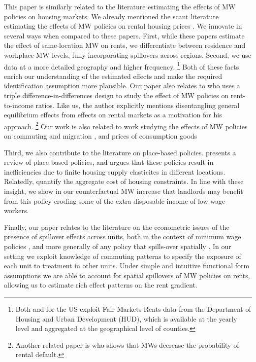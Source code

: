 This paper is similarly related to the literature estimating the effects of MW 
policies on housing markets.
We already mentioned the scant literature estimating the effects of MW policies
on rental housing prices \parencite{Tidemann2018, Yamagishi2021}.
We innovate in several ways when compared to these papers.
First, while these papers estimate the effect of same-location MW on rents, we 
differentiate between residence and workplace MW levels, fully incorporating
spillovers across regions.
Second, we use data at a more detailed geography and higher frequency.%
\footnote{Both \textcite{Tidemann2018} and \textcite{Yamagishi2019} for the US 
exploit Fair Markets Rents data from the Department of Housing and Urban 
Development (HUD), which is available at the yearly level and aggregated at the
geographical level of counties.}
Both of these facts enrich our understanding of the estimated effects and make 
the required identification assumption more plausible.
Our paper also relates to \textcite{Hughes2020} who uses a triple 
difference-in-differences design to study the effect of MW policies 
on rent-to-income ratios. Like us, the author explicitly mentions 
disentangling general equilibrium effects from effects on rental markets as 
a motivation for his approach. 
\footnote{Another related paper is \textcite{AgarwalEtAl2019} who shows that MWs
decrease the probability of rental default.}
Our work is also related to work studying the effects of MW policies on commuting
and migration \parencite{Cadena2014,Monras2019,PerezPerez2021}, and prices of 
consumption goods \parencite{AllegrettoReich2018,Leung2021}

Third, we also contribute to the literature on place-based policies.
\parencite{KlineMoretti2014} presents a review of place-based policies, and argues
that these policies result in inefficiencies due to finite housing supply 
elasticites in different locations.
Relatedly, \textcite{HsiehMoretti2019} quantify the aggregate cost of housing 
constraints.
In line with these insight, we show in our counterfactual MW increase that 
landlords may benefit from this policy eroding some of the extra disposable 
income of low wage workers. 



Finally, our paper relates to the literature on the econometric issues of the 
presence of spillover effects across units,
both in the context of minimum wage policies \parencite{Kuehn2016, Huang2020}, and
more generally of any policy that spills-over spatially
\parencite{DelgadoFlorax2015, Butts2021}. 
In our setting we exploit knowledge of commuting patterns to specify the exposure
of each unit to treatment in other units.
Under simple and intuitive functional form assumptions we are able to account for 
spatial spillovers of MW policies on rents, allowing us
to estimate rich effect patterns on the rent gradient. 

